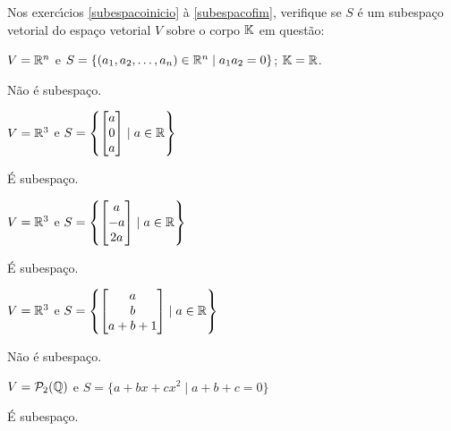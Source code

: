 \documentclass[12pt]{exam}
\begin{document}
Nos exerc{\'\i}cios \ref{subespacoinicio} \`a \ref{subespacofim}, verifique se $S$ \'e um subespa\c{c}o vetorial do espa\c{c}o vetorial $V$ sobre o corpo $\mathbb{K}$ em quest\~ao:
\begin{exercicio}\label{subespacoinicio}
  $V = \mathbb{R}^n$ e $S = \{(a_1, a_2, \dots, a_n) \in \mathbb{R}^n \mid a_1a_2 = 0\}$; $\mathbb{K} = \mathbb{R}$.
  \begin{solucao}
    N\~ao é subespaço.
  \end{solucao}
\end{exercicio}

\begin{exercicio}
    $V = \mathbb{R}^3$ e $S = \left\{\begin{bmatrix}a\\0\\a\end{bmatrix} \mid a \in \mathbb{R}\right\}$
    \begin{solucao}
      É subespaço.
    \end{solucao}
\end{exercicio}

\begin{exercicio}
    $V = \mathbb{R}^3$ e $S = \left\{\begin{bmatrix}a\\-a\\2a\end{bmatrix} \mid a \in \mathbb{R}\right\}$
    \begin{solucao}
      É subespaço.
    \end{solucao}
\end{exercicio}

\begin{exercicio}
    $V = \mathbb{R}^3$ e $S = \left\{\begin{bmatrix}a\\b\\a + b + 1\end{bmatrix} \mid a \in \mathbb{R}\right\}$
    \begin{solucao}
      Não é subespaço.
    \end{solucao}
\end{exercicio}

\begin{exercicio}
    $V = \mathcal{P}_2(\mathbb{Q})$ e $S = \{a + bx + cx^2 \mid a + b + c = 0\}$
    \begin{solucao}
      É subespaço.
    \end{solucao}
\end{exercicio}
\end{document}
